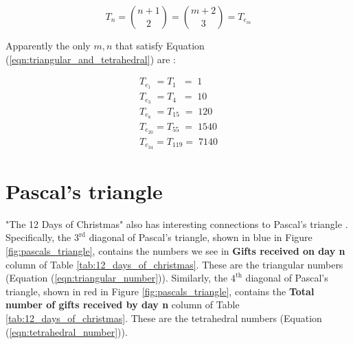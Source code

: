 \documentclass{article}
\theoremstyle{definition}
\begin{document}
\bigskip
\begin{equation}
T_{n} = \binom{n+1}{2} = \binom{m+2}{3} = T_{e_m}
\label{eqn:triangular_and_tetrahedral}
\end{equation}

\vspace{1.5em}
\noindent
Apparently the only $m,n$ that satisfy Equation 
(\ref{eqn:triangular_and_tetrahedral})
are \cite{A027568}:

\medskip
\begin{equation*}
\begin{array}{llllll}
T_{e_1}    \; = T_{1}   \;\; = \; 1    \\
T_{e_3}    \; = T_{4}   \;\; = \; 10   \\
T_{e_8}    \; = T_{15}    \; = \; 120  \\
T_{e_{20}}    = T_{55}    \; = \; 1540 \\
T_{e_{34}}    = T_{119}      = \; 7140 
\end{array}
\end{equation*}

\vspace{0.25em}
\section{Pascal's triangle}
\label{sec:pascals_triangle}
"The 12 Days of Christmas" also has interesting connections to
Pascal's triangle \cite{wiki:pascals_triangle}. Specifically, the
$3^{\text{rd}}$ diagonal of Pascal's triangle, shown in blue in
Figure \ref{fig:pascals_triangle}, contains the numbers we see in
{\bf Gifts received on day n} column of Table
\ref{tab:12_days_of_christmas}. These are the triangular numbers
(Equation (\ref{eqn:triangular_number})).  Similarly, the
$4^{\text{th}}$ diagonal of Pascal's triangle, shown in red in
Figure \ref{fig:pascals_triangle}, contains the {\bf Total number
of gifts received by day n} column of Table
\ref{tab:12_days_of_christmas}. These are the tetrahedral numbers
(Equation (\ref{eqn:tetrahedral_number})).

\vspace{1.5em}
\end{document}
